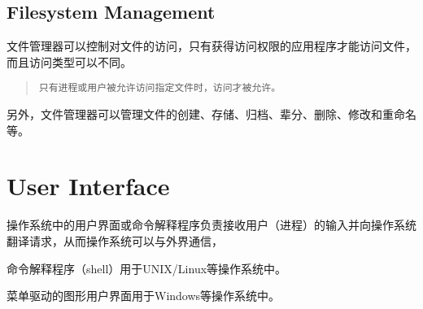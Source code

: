 \subsection{Filesystem Management}

文件管理器可以控制对文件的访问，只有获得访问权限的应用程序才能访问文件，而且访问类型可以不同。

\begin{quote}
\texttt{只有进程或用户被允许访问指定文件时，访问才被允许。}
\end{quote}


另外，文件管理器可以管理文件的创建、存储、归档、辈分、删除、修改和重命名等。




\section{User Interface}


操作系统中的用户界面或命令解释程序负责接收用户（进程）的输入并向操作系统翻译请求，从而操作系统可以与外界通信，

\begin{compactitem}
\item 命令解释程序（shell）用于UNIX/Linux等操作系统中。
\item 菜单驱动的图形用户界面用于Windows等操作系统中。
\end{compactitem}




























































































